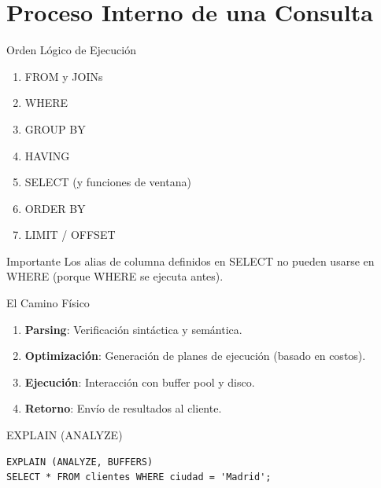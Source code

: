 \documentclass[aspectratio=169, 10pt, xcolor=table]{beamer}
\begin{document}
\section{Proceso Interno de una Consulta}

\begin{frame}{Orden Lógico de Ejecución}
    \begin{enumerate}
        \item FROM y JOINs
        \item WHERE
        \item GROUP BY
        \item HAVING
        \item SELECT (y funciones de ventana)
        \item ORDER BY
        \item LIMIT / OFFSET
    \end{enumerate}
    \begin{alertblock}{Importante}
        Los alias de columna definidos en SELECT no pueden usarse en WHERE (porque WHERE se ejecuta antes).
    \end{alertblock}
\end{frame}

\begin{frame}[fragile]{El Camino Físico}
    \begin{enumerate}
        \item \textbf{Parsing}: Verificación sintáctica y semántica.
        \item \textbf{Optimización}: Generación de planes de ejecución (basado en costos).
        \item \textbf{Ejecución}: Interacción con buffer pool y disco.
        \item \textbf{Retorno}: Envío de resultados al cliente.
    \end{enumerate}
    \begin{block}{EXPLAIN (ANALYZE)}
        \begin{verbatim}
EXPLAIN (ANALYZE, BUFFERS) 
SELECT * FROM clientes WHERE ciudad = 'Madrid';
        \end{verbatim}
    \end{block}
\end{frame}

\end{document}
